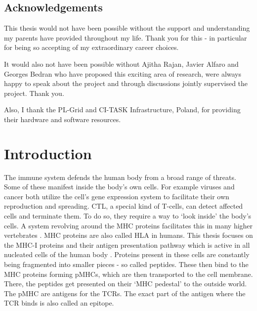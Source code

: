 \documentclass[msc,deptreport,ai]{infthesis} %
\begin{document}
\begin{preliminary}
{}

\maketitle

\section*{Acknowledgements}
This thesis would not have been possible without the support and understanding my parents have provided throughout my life. Thank you for this - in particular for being so accepting of my extraordinary career choices.

It would also not have been possible without Ajitha Rajan, Javier Alfaro and Georges Bedran who have proposed this exciting area of research, were always happy to speak about the project and through discussions jointly supervised the project. Thank you.

Also, I thank the PL-Grid and CI-TASK Infrastructure, Poland, for providing their hardware and software resources.

\newpage\standarddeclaration



\tableofcontents

\end{preliminary}

\chapter{Introduction}
The immune system defends the human body from a broad range of threats. Some of these manifest inside the body's own cells. For example viruses and cancer both utilize the cell's gene expression system to facilitate their own reproduction and spreading. \gls{CTL}, a special kind of T-cells, can detect affected cells and terminate them. To do so, they require a way to `look inside' the body's cells. A system revolving around the \gls{MHC} proteins facilitates this in many higher vertebrates \cite{encyclopaedia_britannica_major_2021}. \gls{MHC} proteins are also called \gls{HLA} in humans. This thesis focuses on the \gls{MHC-I} proteins and their antigen presentation pathway which is active in all nucleated cells of the human body \cite{mosaad_clinical_2015}. Proteins present in these cells are constantly being fragmented into smaller pieces - so called peptides. These then bind to the \gls{MHC} proteins forming \glspl{pMHC}, which are then transported to the cell membrane. There, the peptides get presented on their `MHC pedestal' to the outside world. The  \gls{pMHC} are antigens for the \glspl{TCR}. The exact part of the antigen where the \gls{TCR} binds is also called an epitope. \cite{murphy_janeways_2017, gasser_informatics_2021} 
\end{document}
